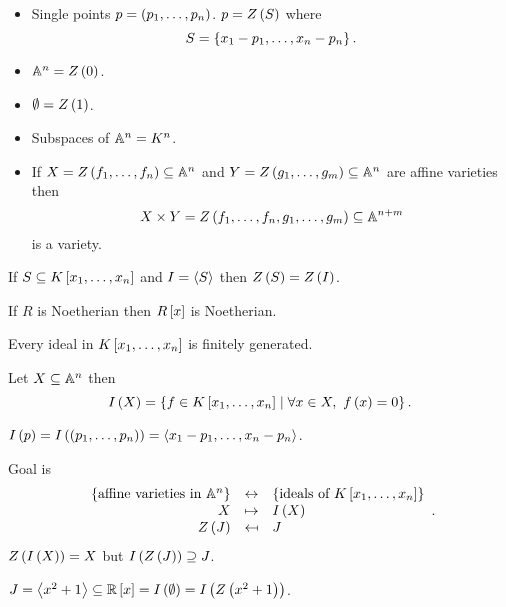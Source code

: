 \begin{example}
\hfill
\begin{itemize}
\item Single points $ p = \rb{p_1, \dots, p_n} $. $ p = Z\rb{S} $ where
$$ S = \cb{x_1 - p_1, \dots, x_n - p_n}. $$
\item $ \A^n = Z\rb{0} $.
\item $ \emptyset = Z\rb{1} $.
\item Subspaces of $ \A^n = K^n $.
\item If $ X = Z\rb{f_1, \dots, f_n} \subseteq \A^n $ and $ Y = Z\rb{g_1, \dots, g_m} \subseteq \A^n $ are affine varieties then
$$ X \times Y = Z\rb{f_1, \dots, f_n, g_1, \dots, g_m} \subseteq \A^{n + m} $$
is a variety.
\end{itemize}
\end{example}

\begin{remark}
If $ S \subseteq K\sb{x_1, \dots, x_n} $ and $ I = \ab{S} $ then $ Z\rb{S} = Z\rb{I} $.
\end{remark}

\begin{theorem}
If $ R $ is Noetherian then $ R\sb{x} $ is Noetherian.
\end{theorem}

\begin{corollary}
Every ideal in $ K\sb{x_1, \dots, x_n} $ is finitely generated.
\end{corollary}

\begin{definition}
Let $ X \subseteq \A^n $ then
$$ I\rb{X} = \cb{f \in K\sb{x_1, \dots, x_n} \mid \forall x \in X, \ f\rb{x} = 0}. $$
\end{definition}

\begin{example}
$ I\rb{p} = I\rb{\rb{p_1, \dots, p_n}} = \ab{x_1 - p_1, \dots, x_n - p_n} $.
\end{example}

Goal is
$$
\begin{array}{rcl}
\cb{\text{affine varieties in} \ \A^n} & \leftrightarrow & \cb{\text{ideals of} \ K\sb{x_1, \dots, x_n}} \\
X & \mapsto & I\rb{X} \\
Z\rb{J} & \mapsfrom & J
\end{array}.
$$
$ Z\rb{I\rb{X}} = X $ but $ I\rb{Z\rb{J}} \supseteq J $.

\begin{example}
$ J = \ab{x^2 + 1} \subseteq \R\sb{x} = I\rb{\emptyset} = I\rb{Z\rb{x^2 + 1}} $.
\end{example}

